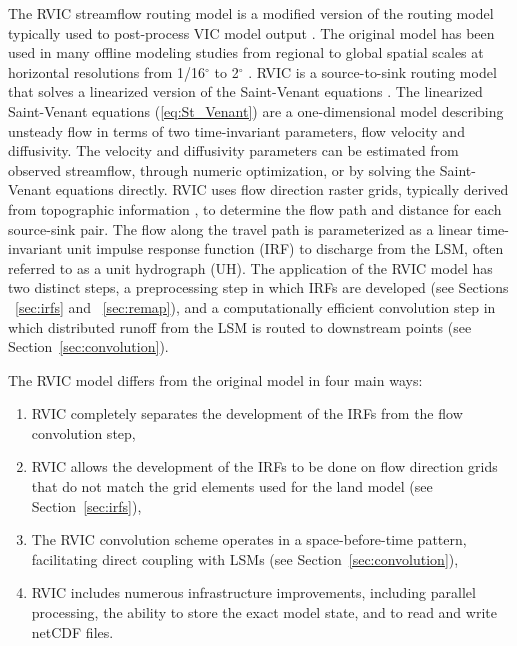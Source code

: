 \documentclass[jgrga, draft]{agutex}
\begin{document}
\begin{article}
The RVIC streamflow routing model is a modified version of the routing model typically used to post-process VIC model output \citep{Lohmann_1996, Lohmann_1998a}.
The original \citet{Lohmann_1996} model has been used in many offline modeling studies from regional to global spatial scales at horizontal resolutions from 1/16$^{\circ}$ to 2$^{\circ}$ \citep[e.g.][]{Nijssen_1997,Lohmann_1998b,Su_2005,Hamlet_2013}.
RVIC is a source-to-sink routing model that solves a linearized version of the Saint-Venant equations \citep{Fread_1992,Mesa_1986}.
The linearized Saint-Venant equations (\ref{eq:St_Venant}) are a one-dimensional model describing unsteady flow in terms of two time-invariant parameters, flow velocity and diffusivity.
The velocity and diffusivity parameters can be estimated from observed streamflow, through numeric optimization, or by solving the Saint-Venant equations directly.
RVIC uses flow direction raster grids, typically derived from topographic information \citep[e.g.][]{Wu_2011}, to determine the flow path and distance for each source-sink pair.
The flow along the travel path is parameterized as a linear time-invariant unit impulse response function (IRF) to discharge from the LSM, often referred to as a unit hydrograph (UH).
The application of the RVIC model has two distinct steps, a preprocessing step in which IRFs are developed (see Sections ~\ref{sec:irfs} and ~\ref{sec:remap}), and a computationally efficient convolution step in which distributed runoff from the LSM is routed to downstream points (see Section~\ref{sec:convolution}).

The RVIC model differs from the original \citet{Lohmann_1996} model in four main ways:

\begin{enumerate}
\item RVIC completely separates the development of the IRFs from the flow convolution step,
\item RVIC allows the development of the IRFs to be done on flow direction grids that do not match the grid elements used for the land model (see Section~\ref{sec:irfs}),
\item The RVIC convolution scheme operates in a space-before-time pattern, facilitating direct coupling with LSMs (see Section~\ref{sec:convolution}),
\item RVIC includes numerous infrastructure improvements, including parallel processing, the ability to store the exact model state, and to read and write netCDF files.
\end{enumerate}


\end{article}
\end{document}
